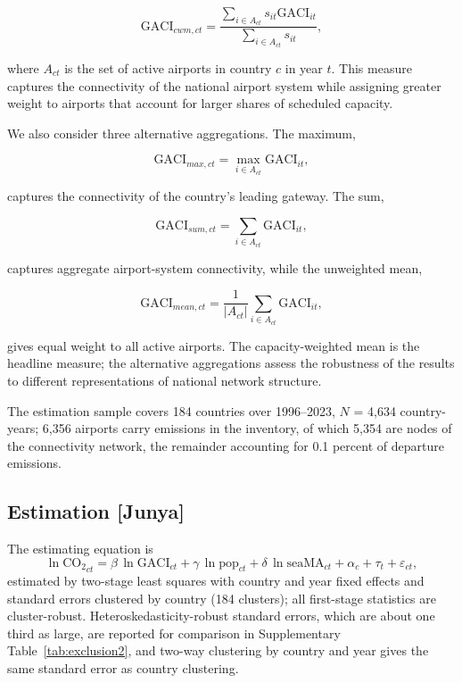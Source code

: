 \documentclass[12pt]{article}
\begin{document}
\begin{equation}
\mathrm{GACI}_{cwm,ct}
=
\frac{
\sum_{i\in A_{ct}}
s_{it}\mathrm{GACI}_{it}
}{
\sum_{i\in A_{ct}}s_{it}
},
\label{eq:nature_21}
\end{equation}

where $A_{ct}$ is the set of active airports in country $c$ in year $t$. This measure captures the connectivity of the national airport system while assigning greater weight to airports that account for larger shares of scheduled capacity.

We also consider three alternative aggregations. The maximum,

\begin{equation}
\mathrm{GACI}_{max,ct}
=
\max_{i\in A_{ct}}\mathrm{GACI}_{it},
\label{eq:nature_22}
\end{equation}

captures the connectivity of the country's leading gateway. The sum,

\begin{equation}
\mathrm{GACI}_{sum,ct}
=
\sum_{i\in A_{ct}}
\mathrm{GACI}_{it},
\label{eq:nature_23}
\end{equation}

captures aggregate airport-system connectivity, while the unweighted mean,

\begin{equation}
\mathrm{GACI}_{mean,ct}
=
\frac{1}{|A_{ct}|}
\sum_{i\in A_{ct}}
\mathrm{GACI}_{it},
\label{eq:nature_24}
\end{equation}

gives equal weight to all active airports. The capacity-weighted mean is the headline measure; the alternative aggregations assess the robustness of the results to different representations of national network structure.

The estimation sample covers 184 countries over 1996--2023, $N$ = 4{,}634 country-years; 6{,}356 airports carry emissions in the inventory, of which 5{,}354 are nodes of the connectivity network, the remainder accounting for 0.1 percent of departure emissions.

\subsection*{Estimation [Junya]}
The estimating equation is
\begin{equation}
\ln \mathrm{CO_2}_{ct} = \beta \,\ln \mathrm{GACI}_{ct}
 + \gamma \,\ln \mathrm{pop}_{ct} + \delta \,\ln \mathrm{seaMA}_{ct}
 + \alpha_c + \tau_t + \varepsilon_{ct},
\label{eq:main}
\end{equation}
estimated by two-stage least squares with country and year fixed effects
and standard errors clustered by country (184 clusters); all first-stage
statistics are cluster-robust. Heteroskedasticity-robust standard errors,
which are about one third as large, are reported for comparison in
Supplementary Table~\ref{tab:exclusion2}, and two-way clustering by
country and year gives the same standard error as country clustering.
\end{document}
